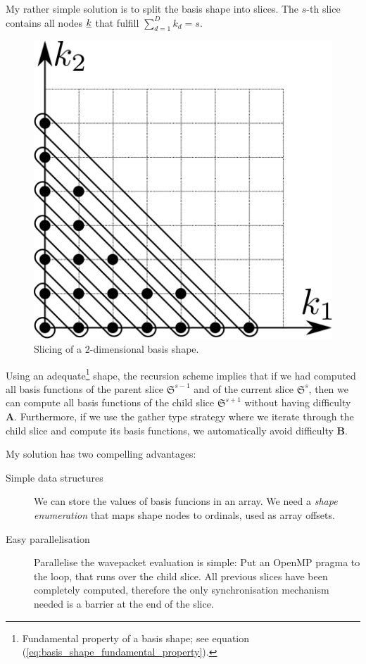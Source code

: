 \documentclass{article}
\begin{document}
My rather simple solution is to split the basis shape into slices.  The
\(s\)-th slice contains all nodes \(\underline{k}\) that fulfill
\( \sum_{d=1}^{D} k_d = s \).

\begin{figure}[H]
  \centering
  \includegraphics{shape_slicing}
  \caption{Slicing of a 2-dimensional basis shape.}
\end{figure}

Using an adequate\footnote{Fundamental property of a basis shape; see equation 
  (\ref{eq:basis_shape_fundamental_property}).} shape, 
the recursion scheme implies that if we had computed all basis
functions of the parent slice \( \mathfrak{S}^{s-1} \) and of the current
slice \( \mathfrak{S}^{s} \), then we can compute all basis functions of
the child slice \( \mathfrak{S}^{s+1} \) without having difficulty
\textbf{A}. Furthermore, if we use the gather type strategy where we
iterate through the child slice and compute its basis functions, we
automatically avoid difficulty \textbf{B}.

My solution has two compelling advantages:
\begin{description}
\item[Simple data structures] We can store the values of basis funcions in
  an array. We need a \emph{shape enumeration}
  that maps shape nodes to ordinals, used as array offsets.
\item[Easy parallelisation] Parallelise the wavepacket evaluation is simple:
  Put an OpenMP pragma to the loop, that runs over the child slice.
  All previous slices have been completely computed,
  therefore the only synchronisation mechanism
  needed is a barrier at the end of the slice.
\end{description}
\end{document}

